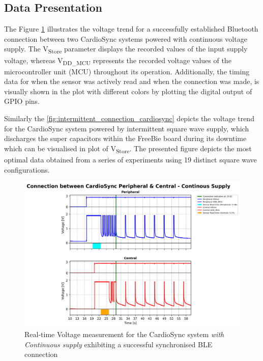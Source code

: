 \subsection{Data Presentation}
The Figure \ref{fig:continous_connection_cardiosync} illustrates the voltage trend for a successfully established Bluetooth connection between two CardioSync systems powered with continuous voltage supply. The V\textsubscript{Store} parameter displays the recorded values of the input supply voltage, whereas V\textsubscript{DD\_MCU} represents the recorded voltage values of the microcontroller unit (MCU) throughout its operation. Additionally, the timing data for when the sensor was actively read and when the connection was made, is visually shown in the plot with different colors by plotting the digital output of GPIO pins.

\noindent Similarly the \autoref{fig:intermittent_connection_cardiosync} depicts the voltage trend for the CardioSync system powered by intermittent square wave supply, which discharges the super capacitors within the FreeBie board during its downtime which can be visualised in plot of V\textsubscript{Store}. The presented figure depicts the most optimal data obtained from a series of experiments using 19 distinct square wave configurations.

\begin{figure}[H]
    \centering
    \includegraphics[width=0.95\linewidth]{chapters/Results/Connection_cardiosync_continous.png}
    \caption{Real-time Voltage measurement for the CardioSync system \textit{with Continuous supply} exhibiting a successful synchronised BLE connection}
    \label{fig:continous_connection_cardiosync}
\end{figure}

